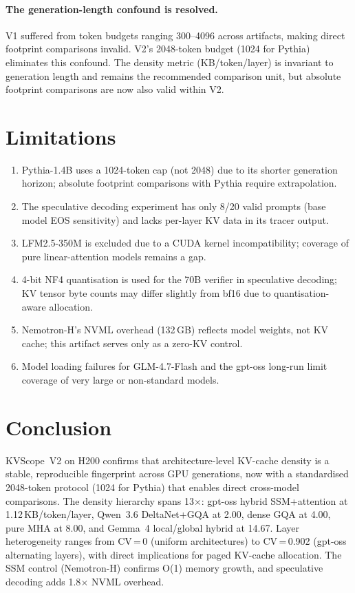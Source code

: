 \documentclass[11pt,a4paper]{article}
\begin{document}
\paragraph{The generation-length confound is resolved.}
V1 suffered from token budgets ranging 300--4096 across
artifacts, making direct footprint comparisons invalid.
V2's 2048-token budget (1024 for Pythia) eliminates this confound.
The density metric (KB/token/layer) is invariant to generation
length and remains the recommended comparison unit, but absolute
footprint comparisons are now also valid within V2.

\section{Limitations}
\label{sec:limitations}

\begin{enumerate}\setlength\itemsep{1pt}
  \item Pythia-1.4B uses a 1024-token cap (not 2048) due to
    its shorter generation horizon; absolute footprint
    comparisons with Pythia require extrapolation.
  \item The speculative decoding experiment has only 8/20 valid
    prompts (base model EOS sensitivity) and lacks per-layer KV
    data in its tracer output.
  \item LFM2.5-350M is excluded due to a CUDA kernel
    incompatibility; coverage of pure linear-attention models
    remains a gap.
  \item 4-bit NF4 quantisation is used for the 70B verifier in
    speculative decoding; KV tensor byte counts may differ
    slightly from bf16 due to quantisation-aware allocation.
  \item Nemotron-H's NVML overhead (132\,GB) reflects model
    weights, not KV cache; this artifact serves only as a
    zero-KV control.
  \item Model loading failures for GLM-4.7-Flash and the
    gpt-oss long-run limit coverage of very large or
    non-standard models.
\end{enumerate}

\section{Conclusion}
\label{sec:conclusion}

KVScope~V2 on H200 confirms that architecture-level KV-cache
density is a stable, reproducible fingerprint across GPU
generations, now with a standardised 2048-token protocol
(1024 for Pythia) that enables direct cross-model comparisons.
The density hierarchy spans 13$\times$:
gpt-oss hybrid SSM+attention at 1.12\,KB/token/layer,
Qwen~3.6 DeltaNet+GQA at 2.00,
dense GQA at 4.00,
pure MHA at 8.00,
and Gemma~4 local/global hybrid at 14.67.
Layer heterogeneity ranges from CV\,=\,0 (uniform architectures)
to CV\,=\,0.902 (gpt-oss alternating layers), with direct
implications for paged KV-cache allocation.
The SSM control (Nemotron-H) confirms O(1) memory growth,
and speculative decoding adds 1.8$\times$ NVML overhead.
\end{document}
